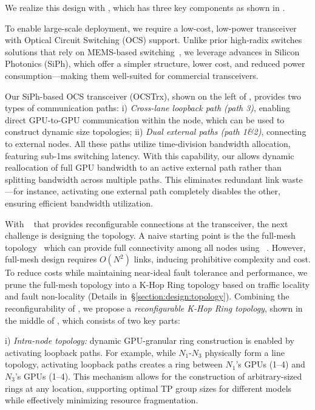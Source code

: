 We realize this design with \sys{}, which has three key components as shown in .


To enable large-scale deployment, we require a low-cost, low-power transceiver with Optical Circuit Switching (OCS) support. Unlike prior high-radix switches solutions that rely on MEMS-based switching~\cite{urata2022missionapollo, mem-optical-switches}, we leverage advances in Silicon Photonics (SiPh), which offer a simpler structure, lower cost, and reduced power consumption—making them well-suited for commercial transceivers.

Our SiPh-based OCS transceiver (OCSTrx), shown on the left of , provides two types of communication paths: i) \textit{Cross-lane loopback path (path 3)}, enabling direct GPU-to-GPU communication within the node, which can be used to construct dynamic size topologies; ii) \textit{Dual external paths (path 1\&2)}, connecting to external nodes. All these paths utilize time-division bandwidth allocation, featuring sub-1ms switching latency. With this capability, our \ocstrx \xspace allows dynamic reallocation of full GPU bandwidth to an active external path rather than splitting bandwidth across multiple paths. This eliminates redundant link waste—for instance, activating one external path completely disables the other, ensuring efficient bandwidth utilization.


With \ocstrx~ that provides reconfigurable connections at the transceiver, the next challenge is designing the topology. A naive starting point is the the full-mesh topology~\cite{fullmesh} which can provide full connectivity among all nodes using \ocstrx~. However, full-mesh design requires $O(N^2)$ links, inducing prohibitive complexity and cost. To reduce costs while maintaining near-ideal fault tolerance and performance, we prune the full-mesh topology into a K-Hop Ring topology based on traffic locality and fault non-locality (Details in~\S\ref{section:design:topology}). Combining the reconfigurability of \ocstrx{}, we propose a \textit{reconfigurable K-Hop Ring topology}, shown in the middle of , which consists of two key parts:

i) \textit{Intra-node topology:} dynamic GPU-granular ring construction is enabled by activating loopback paths. For example, while $N_1$-$N_3$ physically form a line topology, activating loopback paths creates a ring between $N_1$'s GPUs (1–4) and $N_3$'s GPUs (1–4). This mechanism allows for the construction of arbitrary-sized rings at any location, supporting optimal TP group sizes for different models while effectively minimizing resource fragmentation.

